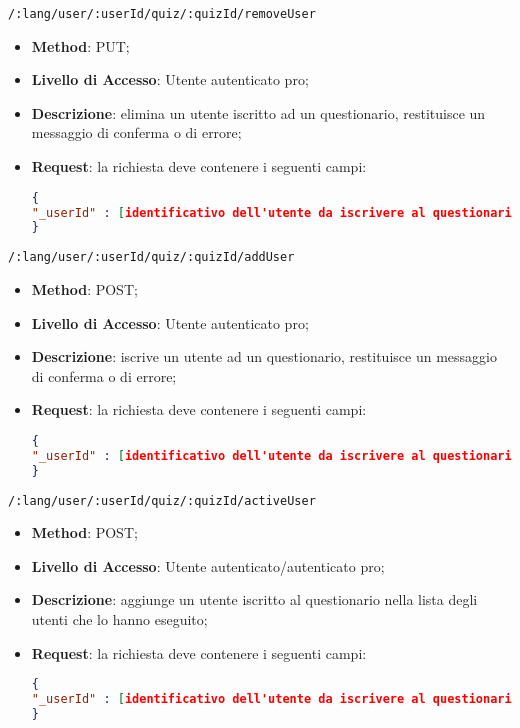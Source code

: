 		
		
	\item \texttt{/:lang/user/:userId/quiz/:quizId/removeUser}
	\begin{itemize}
		\item \textbf{Method}: PUT;
		\item \textbf{Livello di Accesso}: Utente autenticato pro;
		\item \textbf{Descrizione}: elimina un utente iscritto ad un questionario, restituisce un messaggio di conferma o di errore;
		\item \textbf{Request}: la richiesta deve contenere i seguenti campi:
\begin{lstlisting}[language=json,firstnumber=1]
{
"_userId" : [identificativo dell'utente da iscrivere al questionario]
}
\end{lstlisting}
	\end{itemize}
		
		
	\item \texttt{/:lang/user/:userId/quiz/:quizId/addUser}
	\begin{itemize}
		\item \textbf{Method}: POST;
		\item \textbf{Livello di Accesso}: Utente autenticato pro;
		\item \textbf{Descrizione}: iscrive un utente ad un questionario, restituisce un messaggio di conferma o di errore;
		\item \textbf{Request}: la richiesta deve contenere i seguenti campi:
\begin{lstlisting}[language=json,firstnumber=1]
{
"_userId" : [identificativo dell'utente da iscrivere al questionario]
}
\end{lstlisting}
	\end{itemize}
	
	\item \texttt{/:lang/user/:userId/quiz/:quizId/activeUser}
	\begin{itemize}
		\item \textbf{Method}: POST;
		\item \textbf{Livello di Accesso}: Utente autenticato/autenticato pro;
		\item \textbf{Descrizione}: aggiunge un utente iscritto al questionario nella lista degli utenti che lo hanno eseguito;
		\item \textbf{Request}: la richiesta deve contenere i seguenti campi:
\begin{lstlisting}[language=json,firstnumber=1]
{
"_userId" : [identificativo dell'utente da iscrivere al questionario]
}
\end{lstlisting}
	\end{itemize}
	

